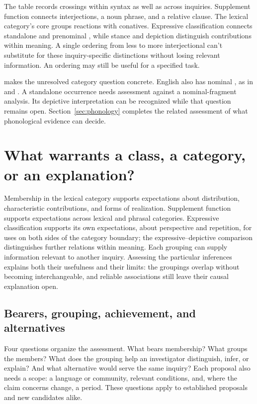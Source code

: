 \documentclass[12pt]{article}
\begin{document}
The table records crossings within syntax as well as across inquiries.
Supplement function connects interjections, a noun phrase, and a relative
clause. The lexical category's core groups reactions with conatives.
Expressive classification connects standalone and prenominal ,
while stance and depiction distinguish contributions within meaning.
A single ordering from less to more interjectional can't
substitute for these inquiry-specific distinctions without losing relevant
information. An ordering may still be useful for a specified task.

 makes the unresolved category question concrete.
English also has nominal , as in
 and . A standalone occurrence
needs assessment against a nominal-fragment analysis.
Its depictive interpretation can be recognized while that question remains
open. Section~\ref{sec:phonology} completes the related assessment of
what phonological evidence can decide.

\section{What warrants a class, a category, or an explanation?}\label{sec:assessment}

Membership in the lexical category supports expectations about distribution,
characteristic contributions, and forms of realization. Supplement function
supports expectations across lexical and phrasal categories. Expressive
classification supports its own expectations, about perspective and
repetition, for uses on both sides of the category boundary; the
expressive--depictive
comparison distinguishes further relations within meaning. Each grouping
can supply information relevant to another inquiry. Assessing the particular
inferences explains both their usefulness and their limits: the groupings
overlap without becoming interchangeable, and reliable associations still
leave their causal explanation open.

\subsection{Bearers, grouping, achievement, and alternatives}

Four questions organize the assessment. What bears membership? What groups
the members? What does the grouping help an investigator distinguish,
infer, or explain? And what alternative would serve the same inquiry?
Each proposal also needs a scope: a language or community, relevant
conditions, and, where the claim concerns change, a period. These
questions apply to established proposals and new candidates alike.
\end{document}
